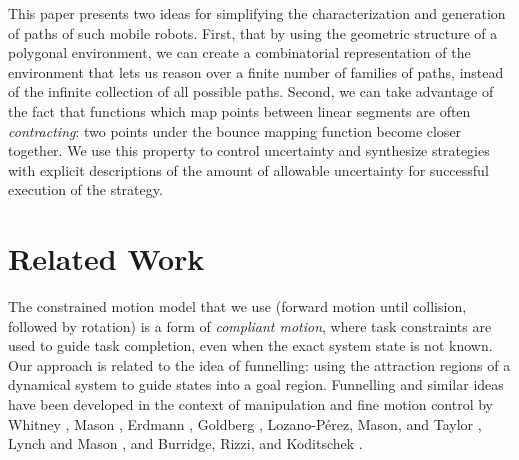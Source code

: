 \documentclass[]{styles/svproc}  %
\begin{document}
This paper presents two ideas for simplifying the characterization and
generation of paths of such mobile robots.  First, that by using the geometric
structure of a polygonal environment, we can create a combinatorial
representation of the environment that lets us reason over a finite number of
families of paths, instead of the infinite collection of all possible paths.
Second, we can take advantage of the fact that functions which map points
between linear segments are often \emph{contracting}: two points under the
bounce mapping function become closer together.  We use this property to
control uncertainty and synthesize strategies with explicit descriptions of the
amount of allowable uncertainty for successful execution of the strategy.





\section{Related Work}

The constrained motion model that we use (forward motion until collision,
followed by rotation) is a
form of \emph{compliant motion}, where task constraints are used to guide task
completion, even when the exact system state is not known. Our approach is
related to the idea of funnelling: using
the attraction regions of a dynamical system to guide states into a goal region.
Funnelling and similar ideas have been developed in the context of manipulation and fine motion control by Whitney
\cite{Whi77}, Mason \cite{Mas85}, Erdmann
\cite{Erd86}, Goldberg \cite{Gol93}, Lozano-P{\'e}rez, Mason, and Taylor
\cite{LozMasTay84}, Lynch and Mason \cite{LynMas95}, and Burridge, Rizzi, and Koditschek \cite{BurRizKod99}.
\end{document}
